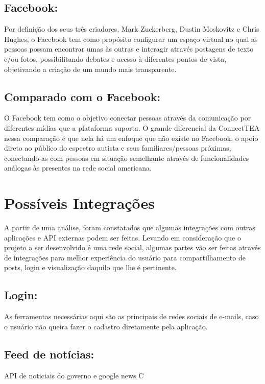 \begin{apendicesenv}
	
	\subsection{Facebook:}
	Por definição dos seus três criadores, Mark Zuckerberg, Dustin Moskovitz e Chris Hughes, o Facebook tem como propósito configurar um espaço virtual no qual as pessoas possam encontrar umas às outras e interagir através postagens de texto e/ou fotos, possibilitando debates e acesso à diferentes pontos de vista, objetivando a criação de um mundo mais transparente.
	
	\subsection{Comparado com o Facebook:}
	O Facebook tem como o objetivo conectar pessoas através da comunicação por diferentes mídias que a plataforma suporta. O grande diferencial da ConnectTEA nessa comparação é que nela há um enfoque que não existe no Facebook, o apoio direto ao público do espectro autista e seus familiares/pessoas próximas, conectando-as com pessoas em situação semelhante através de funcionalidades análogas às presentes na rede social americana.
	
	
	
	
	
	\section{Possíveis Integrações}
	A partir de uma análise, foram constatados que algumas integrações com outras aplicações e API externas podem ser feitas. Levando em consideração que o projeto a ser desenvolvido é uma rede social, algumas partes vão ser feitas através de integrações para melhor experiência do usuário para compartilhamento de posts, login e visualização daquilo que lhe é pertinente. 
	
	\subsection{Login:}
	As ferramentas necessárias aqui são as principais de redes sociais de e-mails, caso o usuário não queira fazer o cadastro diretamente pela aplicação. 
	\subsection{Feed de notícias:}
	API de noticiais do governo e google news C

\end{apendicesenv}
